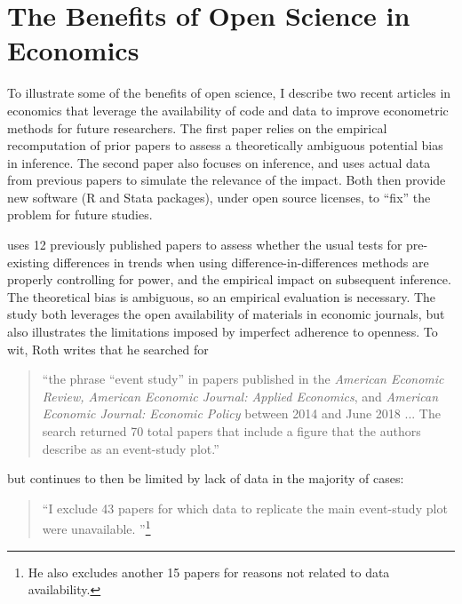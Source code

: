 \documentclass{article}
\begin{document}
{%
%

\section{The Benefits of Open Science in Economics}
\label{sec:benefits}

To illustrate some of the benefits of open science, I describe two recent articles in economics that leverage the availability of code and data to improve econometric methods for future researchers. The first paper relies on the empirical recomputation of prior papers to assess a theoretically ambiguous potential bias in inference. The second paper also focuses on inference, and uses actual data from previous papers to simulate the relevance of the impact. Both then provide new software (R and Stata packages), under open source licenses, to ``fix'' the problem for future studies. 

\citet{roth_pretest_2022}  uses 12 previously published papers to assess whether the usual tests for pre-existing differences in trends when using difference-in-differences methods are properly controlling for power, and the empirical impact on subsequent inference. The theoretical bias is ambiguous, so an empirical evaluation is necessary. The study both leverages the open availability of materials in economic journals, but also illustrates the limitations imposed by imperfect adherence to openness. To wit, Roth writes that he searched for 

\begin{quote}
``the phrase “event study” in papers published in the \textit{American Economic Review, American Economic Journal: Applied Economics}, and \textit{American Economic Journal: Economic Policy} between
2014 and June 2018 ... The search returned 70 total papers that include a figure that the authors describe as an event-study plot.''
\end{quote}

but continues to then be limited by lack of data in the majority of cases:

\begin{quote}
    ``I exclude 43 papers for which data to replicate the main event-study plot were unavailable. \citep[pg. 307]{roth_pretest_2022}''\footnote{He also excludes another 15 papers for reasons not related to data availability.}
\end{quote}

}
\end{document}
